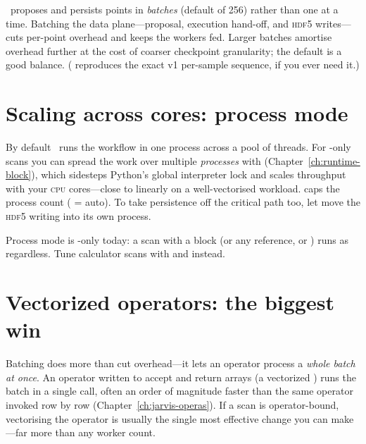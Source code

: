 \Jarvis\ proposes and persists points in \emph{batches} (default  of
256) rather than one at a time. Batching the data plane---proposal, execution hand-off, and
\textsc{hdf5} writes---cuts per-point overhead and keeps the workers fed. Larger batches amortise
overhead further at the cost of coarser checkpoint granularity; the default is a good balance.
( reproduces the exact v1 per-sample sequence, if you ever need it.)

\section{Scaling across cores: process mode}
\label{sec:perf-process}

By default \Jarvis\ runs the workflow in one process across a pool of threads. For
-only scans you can spread the work over multiple \emph{processes} with
 (Chapter~\ref{ch:runtime-block}), which sidesteps Python's global
interpreter lock and scales throughput with your \textsc{cpu} cores---close to linearly on a
well-vectorised workload.  caps the process count ( = auto). To take
persistence off the critical path too, let  move the \textsc{hdf5}
writing into its own process.

\begin{jwarn}
Process mode is -only today: a scan with a  block (or any
 reference, or ) runs as  regardless.
Tune calculator scans with  and 
instead.
\end{jwarn}

\section{Vectorized operators: the biggest win}
\label{sec:perf-vectorized}

Batching does more than cut overhead---it lets an  operator process a \emph{whole
batch at once}. An operator written to accept and return arrays (a vectorized )
runs the batch in a single call, often an order of magnitude faster than the same operator invoked
row by row (Chapter~\ref{ch:jarvis-operas}). If a scan is operator-bound, vectorising the operator is
usually the single most effective change you can make---far more than any worker count.

